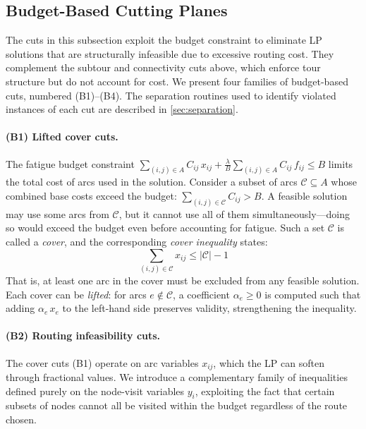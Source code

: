 \documentclass[preprint,11pt]{elsarticle}
\begin{document}
\subsection{Budget-Based Cutting Planes}

The cuts in this subsection exploit the budget constraint to eliminate LP solutions that are structurally infeasible due to excessive routing cost.
They complement the subtour and connectivity cuts above, which enforce tour structure but do not account for cost.
We present four families of budget-based cuts, numbered (B1)--(B4).
The separation routines used to identify violated instances of each cut are described in \cref{sec:separation}.

\paragraph{(B1) Lifted cover cuts.}
The fatigue budget constraint $\sum_{(i,j) \in A} C_{ij}\, x_{ij} + \tfrac{\lambda}{B} \sum_{(i,j) \in A} C_{ij}\, f_{ij} \leq B$ limits the total cost of arcs used in the solution.
Consider a subset of arcs $\mathcal{C} \subseteq A$ whose combined base costs exceed the budget: $\sum_{(i,j) \in \mathcal{C}} C_{ij} > B$.
A feasible solution may use some arcs from $\mathcal{C}$, but it cannot use all of them simultaneously---doing so would exceed the budget even before accounting for fatigue.
Such a set $\mathcal{C}$ is called a \emph{cover}, and the corresponding \emph{cover inequality} states:
\begin{equation}
  \sum_{(i,j) \in \mathcal{C}} x_{ij} \leq |\mathcal{C}| - 1
  \label{eq:cover}
\end{equation}
That is, at least one arc in the cover must be excluded from any feasible solution.
Each cover can be \emph{lifted}: for arcs $e \notin \mathcal{C}$, a coefficient $\alpha_e \geq 0$ is computed such that adding $\alpha_e\, x_e$ to the left-hand side preserves validity, strengthening the inequality.

\paragraph{(B2) Routing infeasibility cuts.}
The cover cuts (B1) operate on arc variables $x_{ij}$, which the LP can soften through fractional values.
We introduce a complementary family of inequalities defined purely on the node-visit variables $y_i$, exploiting the fact that certain subsets of nodes cannot all be visited within the budget regardless of the route chosen.
\end{document}
